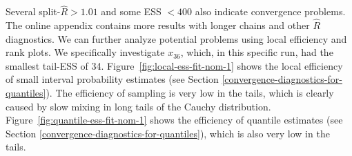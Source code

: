 \documentclass[american,]{article}
\theoremstyle{definition}
\begin{document}


Several split-\(\widehat{R}>1.01\) and some ESS \(<400\)
also indicate convergence problems. The online appendix contains more results 
with longer chains and other \(\widehat{R}\) diagnostics.
%
We can further analyze potential problems using local efficiency and
rank plots. We specifically investigate \(x_{36}\), which, in this
specific run, had the smallest tail-ESS of 34. 
Figure~\ref{fig:local-ess-fit-nom-1} shows the local efficiency of small 
interval probability estimates (see Section \ref{convergence-diagnostics-for-quantiles}).
The efficiency of sampling is very low in the tails, which is clearly
caused by slow mixing in long tails of the Cauchy distribution.  
%
Figure~\ref{fig:quantile-ess-fit-nom-1} shows the efficiency
of quantile estimates (see Section \ref{convergence-diagnostics-for-quantiles}), 
which is also very low in the tails. 
\end{document}
